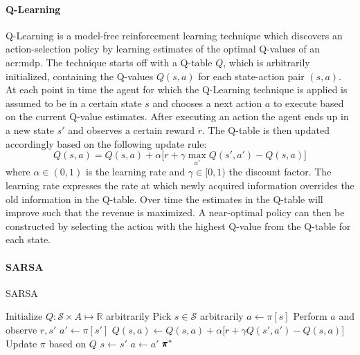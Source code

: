 \paragraph{Q-Learning}
\label{sec:q-learning}

Q-Learning \cite{dayan1992q, sutton1998reinforcement} is a model-free reinforcement learning technique which discovers an action-selection policy by learning estimates of the optimal Q-values of an \acrshort{acr:mdp}.
The technique starts off with a Q-table $Q$, which is arbitrarily initialized, containing the Q-values $Q(s,a)$ for each state-action pair $(s,a)$.
At each point in time the agent for which the Q-Learning technique is applied is assumed to be in a certain state $s$ and chooses a next action $a$ to execute based on the current Q-value estimates.
After executing an action the agent ends up in a new state $s'$ and observes a certain reward $r$.
The Q-table is then updated accordingly based on the following update rule:
\[
Q(s, a) = Q(s, a) + \alpha \Big[r + \gamma \max_{a'} Q(s',a') - Q(s, a)\Big]
\]
where $\alpha \in (0,1)$ is the learning rate and $\gamma \in [0, 1)$ the discount factor.
The learning rate expresses the rate at which newly acquired information overrides the old information in the \mbox{Q-table}.
Over time the estimates in the Q-table will improve such that the revenue is maximized.
A near-optimal policy can then be constructed by selecting the action with the highest Q-value from the Q-table for each state.

% 

\paragraph{SARSA}
\label{sec:sarsa}

\begin{algorithm}[!t]
	\caption{SARSA}
	\label{alg:sarsa}
	\begin{algorithmic}[1]
		\Require{State space $\mathcal{S}$, Action space $A$, Learning rate $\alpha \in (0, 1)$, Discount factor $\gamma \in [0, 1)$}
		\State Initialize $Q: \mathcal{S} \times A \mapsto \mathbb{R}$ arbitrarily
		\Repeat
		\State Pick $s \in \mathcal{S}$ arbitrarily
		\State $a \gets \pi[s]$ 
		\Repeat
		\State Perform $a$ and observe $r, s'$
		\State $a' \gets \pi[s']$
		\State $Q(s,a) \gets Q(s,a) + \alpha \Big[r + \gamma Q(s', a') - Q(s, a)\Big]$
		\State Update $\pi$ based on $Q$
		\State $s \gets s'$
		\State $a \gets a'$
		\State\Return $\pmb{\pi}^*$
	\end{algorithmic}
\end{algorithm}

